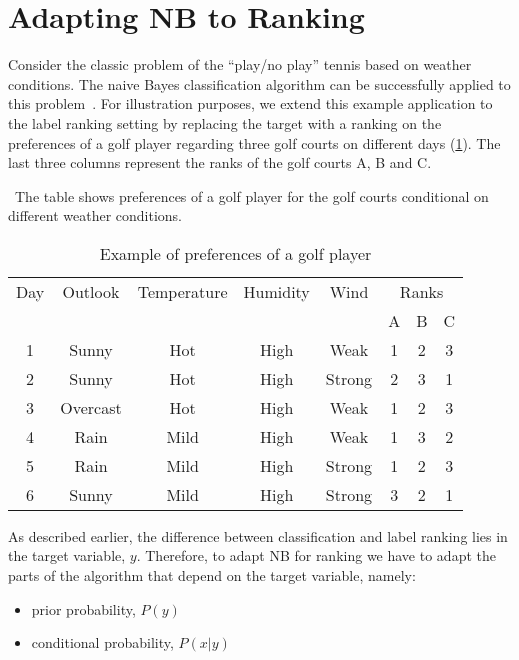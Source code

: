 \documentclass[a4paper,twoside,12pt,openright,notitlepage]{report}\usepackage[]{graphicx}\usepackage[]{color}
\begin{document}
\section{Adapting NB to Ranking}
\label{ch2-sec:adapting}
Consider the classic problem of the ``play/no play'' tennis based on  weather conditions. The naive Bayes classification algorithm can be successfully applied to this problem~\citep[chap. 6]{mitchell1997}. For illustration purposes, we extend this example application to the label ranking setting by replacing the target with a ranking on the preferences of a golf player regarding three golf courts on different days (\ref{ch2-tab01}). The last three columns represent the ranks of the golf courts A, B and C.

\begin{table}
\caption{Example of preferences of a golf player}
\ The table shows preferences of a golf player for the golf courts conditional on different weather conditions.
\begin{center}
\begin{tabular}{cccccccc}
\toprule
Day&Outlook&Temperature&Humidity&Wind&\multicolumn{3}{c}{Ranks}\\
\cline{6-8}
&&&&&A&B&C\\
\midrule
 1 & Sunny & Hot & High & Weak &   1 &   2 &   3 \\ 
  2 & Sunny & Hot & High & Strong &   2 &   3 &   1 \\ 
  3 & Overcast & Hot & High & Weak &   1 &   2 &   3 \\ 
  4 & Rain & Mild & High & Weak &   1 &   3 &   2 \\ 
  5 & Rain & Mild & High & Strong &   1 &   2 &   3 \\ 
  6 & Sunny & Mild & High & Strong &   3 &   2 &   1 \\ 
  
\bottomrule
\end{tabular}
\end{center}
\label{ch2-tab01}
\end{table}

As described earlier, the difference between classification and label ranking lies in the target variable, $y$. Therefore, to adapt NB for ranking we have to adapt the parts of the algorithm that depend on the target variable, namely:
\begin{itemize}
\item prior probability, $P(y)$
\item conditional probability, $P(x|y)$
\end{itemize}
\end{document}
